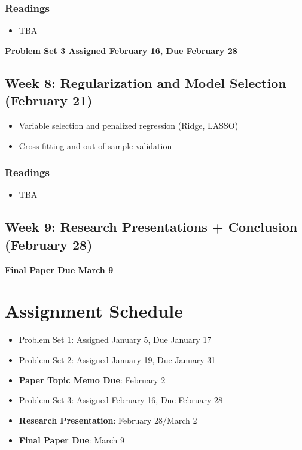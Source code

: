 \documentclass[11pt, article, oneside]{memoir}
\theoremstyle{Assumption}
\begin{document}
\subsubsection*{Readings}

\begin{itemize}
\item TBA
\end{itemize}

\textbf{Problem Set 3 Assigned February 16, Due February 28}

\subsection{Week 8: Regularization and Model Selection (February 21)}

\begin{itemize}
\item Variable selection and penalized regression (Ridge, LASSO) 
\item Cross-fitting and out-of-sample validation
\end{itemize}

\subsubsection*{Readings}

\begin{itemize}
\item TBA
\end{itemize}

\subsection{Week 9: Research Presentations + Conclusion (February 28)}

\textbf{Final Paper Due March 9}

\section*{Assignment Schedule}

\begin{itemize}
\item Problem Set 1: Assigned January 5, Due January 17
\item Problem Set 2: Assigned January 19, Due January 31
\item \textbf{Paper Topic Memo Due}: February 2
\item Problem Set 3: Assigned February 16, Due February 28
\item \textbf{Research Presentation}: February 28/March 2
\item \textbf{Final Paper Due}: March 9
\end{itemize}
\end{document}
